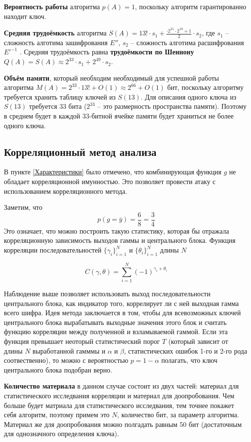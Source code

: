 \documentclass[a4paper,12pt]{article}
\theoremstyle{definition}
\begin{document}
	
	\textbf{Вероятность работы} алгоритма $p(A)=1$, поскольку алгоритм гарантированно находит ключ. 
	
	\textbf{Средняя трудоёмкость} алгоритма $S(A)= 13! \cdot s_1 + \frac{\cdot 2^{31} \cdot 2^{19} + 1}{2} \cdot s_2 $, где $s_1$ -- сложность алготима зашифрования $E''$, $s_2$ -- сложность алготима расшифрования $E'^{-1}$ . Средняя трудоёмкость равна \textbf{трудоёмкости по Шеннону} $Q(A) = S(A) \approx 2^{33} \cdot s_1 + 2^{49} \cdot s_2$.
	
	\textbf{Объём памяти}, который необходим необходимый для успешной работы алгоритма $M(A) = 2^{33} \cdot 13! + O(1) \approx 2^{66} + O(1)$ бит, поскольку алгоритму требуется хранить таблицу ключей из $S(13)$. Для описания одного ключа из $S(13)$ требуется 33 бита ($2^{33}$ -- это размерность пространства памяти). Поэтому в среднем будет в каждой 33-битной ячейке памяти будет храниться не более одного ключа. 
	

	\subsection{Корреляционный метод анализа}
	
	В пункте \ref{Характеристики} было отмечено, что комбинирующая функция $g$ не обладает корреляционной имунностью. Это позволяет провести атаку с использованием корреляционного метода.
	
	Заметим, что 
	\[ p(g= \bar{y}) = \frac{6}{8} = \frac{3}{4} \]
	Это означает, что можно построить такую статистику, которая бы отражала корреляционную зависимость выходов гаммы и центрального блока. Функция корреляции последовательностей $\{\gamma_i\}_{i=1}^N$ и $\{\theta_i\}_{i=1}^N$ длины $N$
	
	\[  C(\gamma, \theta) = \sum_{i=1}^{N} \left(-1\right)^{\gamma_i +\theta_i} \]
	
	Наблюдение выше позволяет использовать выход последовательности центрального блока, как индикатор того, коррелирует ли с ней выходная гамма всего шифра. Идея метода заключается в том, чтобы для всевозможных ключей центрального блока вырабатывать выходные значения этого блок и считать функцию корреляции между полученной и взламываемой гаммой. Если эта функция превышает неоторый статистический порог $T$ (который зависит от длины $N$ выработанной гамммы и $\alpha$ и $\beta$, статистических ошибок 1-го и 2-го рода соотвественно), то можно с вероятностью $p=1-\alpha$ полагать, что ключ центрального блока подобран верно.

	\textbf{Количество материала} в данном случае состоит из двух частей: материал для статистического исследвания корреляции и материал для доопробования. Чем больше будет матриала для статистического исследвания, тем точнее покажет себя алгоритм, поэтому примем это $N$, количество бит, за параметр алгоритма. Материал же для доопробования можно полгадать равным 50 бит (достаточным для однозначного определения ключа).
	
\end{document}
